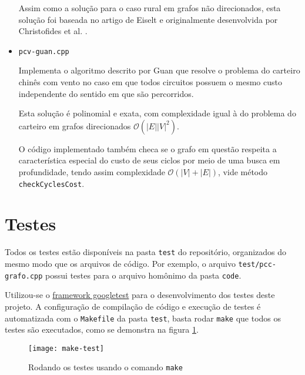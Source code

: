 \begin{itemize}
        Assim como a solução para o caso rural em grafos não direcionados, esta solução foi baseada no artigo de Eiselt \cite{michel} e originalmente desenvolvida por Christofides et al. \cite{christofides-86}.
            
    \item \texttt{pcv-guan.cpp}

        Implementa o algoritmo descrito por Guan \cite{guan-windy} que resolve o problema do carteiro chinês com vento no caso em que todos circuitos possuem o mesmo custo independente do sentido em que são percorridos.
        
        Esta solução é polinomial e exata, com complexidade igual à do problema do carteiro em grafos direcionados $\mathcal{O}(|E||V|^2)$.
        
        O código implementado também checa se o grafo em questão respeita a característica especial do custo de seus ciclos por meio de uma busca em profundidade, tendo assim complexidade $\mathcal{O}(|V| + |E|)$, vide método \texttt{checkCyclesCost}.

\end{itemize}

\section{Testes}

Todos os testes estão disponíveis na pasta \texttt{test} do repositório, organizados do mesmo modo que os arquivos de código.
Por exemplo, o arquivo \texttt{test/pcc-grafo.cpp} possui testes para o arquivo homônimo da pasta \texttt{code}.


Utilizou-se o \href{https://github.com/google/googletest}{framework googletest} para o desenvolvimento dos testes deste projeto.
A configuração de compilação de código e execução de testes é automatizada com o \texttt{Makefile} da pasta \texttt{test}, basta rodar \texttt{make} que todos os testes são executados, como se demonstra na figura \ref{maketest}.

\begin{figure}[h]
    \centering
    \texttt{[image: make-test]}
    \caption{Rodando os testes usando o comando \texttt{make}}
    \label{maketest}
\end{figure}

